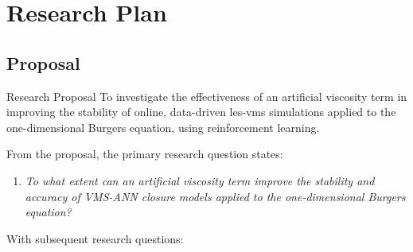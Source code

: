 \chapter{Research Plan} \label{ch:research_plan}

\section{Proposal} \label{sec:proposal}


\begin{bluebox}{Research Proposal}
    \noindent To investigate the effectiveness of an artificial viscosity term in improving the stability of online, data-driven \gls{les}-\gls{vms} simulations applied to the one-dimensional Burgers equation, using reinforcement learning.
\end{bluebox}

From the proposal, the primary research question states:

\begin{enumerate}[label=\textbf{\color{titlecolor}PRQ:}]
    \item \textit{To what extent can an artificial viscosity term improve the stability and accuracy of VMS-ANN closure models applied to the one-dimensional Burgers equation?}
\end{enumerate}

With subsequent research questions:

